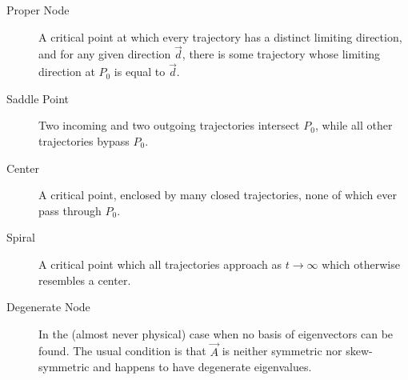 \begin{description}
    \item[Proper Node] A critical point at which every trajectory has a distinct
        limiting direction, and for any given direction $ \vec{d} $, there is some
        trajectory whose limiting direction at $ P_0 $ is equal to $ \vec{d} $.
    \item[Saddle Point] Two incoming and two outgoing trajectories intersect $ P_0 $,
        while all other trajectories bypass $ P_0 $.
    \item[Center] A critical point, enclosed by many closed trajectories, none of
        which ever pass through $ P_0 $.
    \item[Spiral] A critical point which all trajectories approach as
        $ t \to \infty $ which otherwise resembles a center.
    \item[Degenerate Node] In the (almost never physical) case when no basis of
        eigenvectors can be found. The usual condition is that $ \vec{A} $ is neither
        symmetric nor skew-symmetric and happens to have degenerate eigenvalues.
        \begin{figure}[H]
            \centering
            \begin{subfigure}[b]{0.49\textwidth}
\end{subfigure}
\end{figure}
\end{description}
